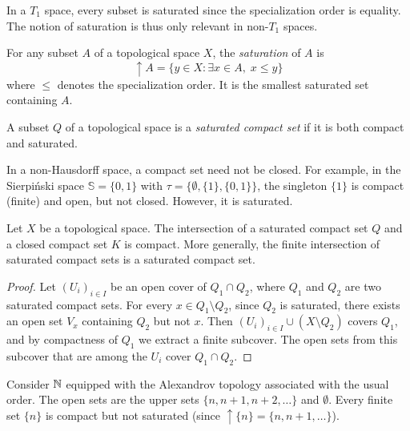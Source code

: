 \begin{remark}
In a $T_1$ space, every subset is saturated since the specialization order is equality.
The notion of saturation is thus only relevant in non-$T_1$ spaces.
\end{remark}

\begin{proposition}
For any subset $A$ of a topological space $X$, the \emph{saturation} of $A$ is
\[
  \uparrow\! A = \{ y \in X : \exists x \in A, \; x \leq y \}
\]
where $\leq$ denotes the specialization order. It is the smallest saturated set
containing $A$.
\end{proposition}

\begin{definition}
A subset $Q$ of a topological space is a \emph{saturated compact set} if it is both
compact and saturated.
\end{definition}

\begin{attention}
In a non-Hausdorff space, a compact set need not be closed. For example, in the
Sierpi\'nski space $\mathbb{S} = \{0,1\}$ with $\tau = \{\emptyset, \{1\}, \{0,1\}\}$,
the singleton $\{1\}$ is compact (finite) and open, but not closed. However, it is
saturated.
\end{attention}

\begin{theorem}
\label{thm:inter-compact-saturated}
Let $X$ be a topological space. The intersection of a saturated compact set $Q$ and a
closed compact set $K$ is compact. More generally, the finite intersection of saturated
compact sets is a saturated compact set.
\end{theorem}

\begin{proof}
Let $(U_i)_{i \in I}$ be an open cover of $Q_1 \cap Q_2$, where $Q_1$ and $Q_2$ are two
saturated compact sets. For every $x \in Q_1 \setminus Q_2$, since $Q_2$ is saturated,
there exists an open set $V_x$ containing $Q_2$ but not $x$. Then
$(U_i)_{i \in I} \cup (X \setminus Q_2)$ covers $Q_1$, and by compactness of $Q_1$ we
extract a finite subcover. The open sets from this subcover that are among the $U_i$
cover $Q_1 \cap Q_2$.
\end{proof}

\begin{example}
Consider $\mathbb{N}$ equipped with the Alexandrov topology associated with the usual order.
The open sets are the upper sets $\{n, n+1, n+2, \ldots\}$ and $\emptyset$. Every finite
set $\{n\}$ is compact but not saturated (since $\uparrow\!\{n\} = \{n, n+1, \ldots\}$).
\end{example}

